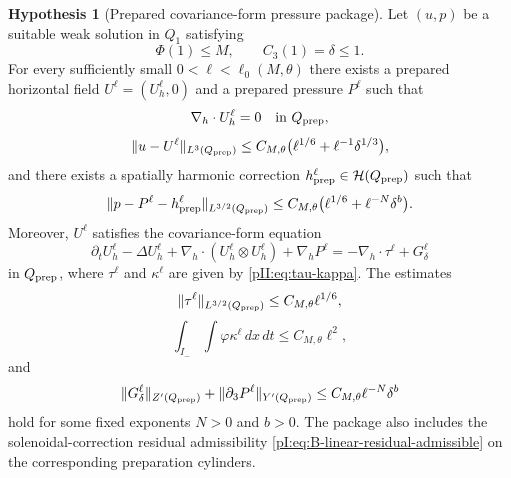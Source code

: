 \documentclass[11pt]{article}
\numberwithin{equation}{section}
\theoremstyle{plain}
\theoremstyle{definition}
\newtheorem{hypothesis}{Hypothesis}[section]
\theoremstyle{remark}
\newcommand{\dxdt}{\,dx\,dt}
\newcommand{\calH}{\mathcal H}
\begin{document}
\begin{hypothesis}[Prepared covariance-form pressure package]\label{pII:ass:prepared-package}
Let $(u,p)$ be a suitable weak solution in $Q_1$ satisfying
\[
        \Phi(1)\le M,
        \qquad
        C_3(1)=\delta\le1.
\]
For every sufficiently small $0<\ell<\ell_0(M,\theta)$ there exists a prepared horizontal field $U^\ell=(U_h^\ell,0)$ and a prepared pressure $P^\ell$ such that
\begin{equation}\label{pII:eq:solenoidal-prep}
        \nabla_h\cdot U_h^\ell=0
        \quad\text{in }Q_{\rm prep},
\end{equation}
\begin{equation}\label{pII:eq:prep-tail-package}
        \|u-U^\ell\|_{L^3(Q_{\rm prep})}
        \le C_{M,\theta}\bigl(\ell^{1/6}+\ell^{-1}\delta^{1/3}\bigr),
\end{equation}
and there exists a spatially harmonic correction \(h_{\rm prep}^\ell\in\calH(Q_{\rm prep})\) such that
\begin{equation}\label{pII:eq:prep-pressure-tail}
        \|p-P^\ell-h_{\rm prep}^\ell\|_{L^{3/2}(Q_{\rm prep})}
        \le C_{M,\theta}\bigl(\ell^{1/6}+\ell^{-N}\delta^b\bigr).
\end{equation}
Moreover, $U^\ell$ satisfies the covariance-form equation
\begin{equation}\label{pII:eq:prepared-covariance-equation}
        \partial_tU_h^\ell-\Delta U_h^\ell
        +\nabla_h\cdot(U_h^\ell\otimes U_h^\ell)+\nabla_hP^\ell
        =-\nabla_h\cdot\tau^\ell+G_\delta^\ell
\end{equation}
in $Q_{\rm prep}$, where $\tau^\ell$ and $\kappa^\ell$ are given by \eqref{pII:eq:tau-kappa}.  The estimates
\begin{equation}\label{pII:eq:tau-est}
        \|\tau^\ell\|_{L^{3/2}(Q_{\rm prep})}
        \le C_{M,\theta}\ell^{1/6},
\end{equation}
\begin{equation}\label{pII:eq:kappa-average}
        \int_{I_-}\int \varphi\kappa^\ell\dxdt
        \le C_{M,\theta}\ell^2,
\end{equation}
and
\begin{equation}\label{pII:eq:G-est}
        \|G_\delta^\ell\|_{Z'(Q_{\rm prep})}
        +\|\partial_3P^\ell\|_{Y'(Q_{\rm prep})}
        \le C_{M,\theta}\ell^{-N}\delta^b
\end{equation}
hold for some fixed exponents $N>0$ and $b>0$.  The package also includes the solenoidal-correction residual admissibility \eqref{pI:eq:B-linear-residual-admissible} on the corresponding preparation cylinders.
\end{hypothesis}
\end{document}
